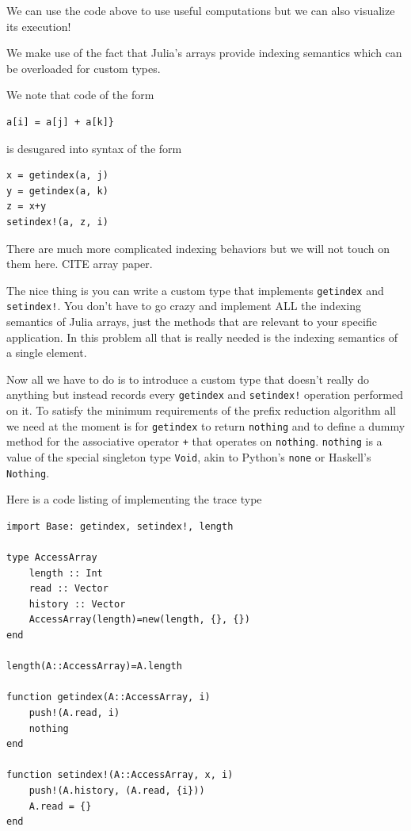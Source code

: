 \documentclass{sig-alternate}
\newcommand{\code}[1]{\texttt{#1}}
\begin{document}
We can use the code above to use useful computations but we can also visualize its execution!

We make use of the fact that Julia's arrays provide indexing semantics which can be overloaded for custom types.

We note that code of the form

\begin{verbatim}
a[i] = a[j] + a[k]}
\end{verbatim}
is desugared into syntax of the form

\begin{verbatim}
x = getindex(a, j)
y = getindex(a, k)
z = x+y
setindex!(a, z, i)
\end{verbatim}

There are much more complicated indexing behaviors but we will not touch on them here. CITE array paper.

The nice thing is you can write a custom type that implements \code{getindex} and \code{setindex!}. You don't have to go crazy and implement ALL the indexing semantics of Julia arrays, just the methods that are relevant to your specific application. In this problem all that is really needed is the indexing semantics of a single element.

Now all we have to do is to introduce a custom type that doesn't really do anything but instead records every \code{getindex} and \code{setindex!} operation performed on it. To satisfy the minimum requirements of the prefix reduction algorithm all we need at the moment is for \code{getindex} to return \code{nothing} and to define a dummy method for the associative operator \code{+} that operates on \code{nothing}. \code{nothing} is a value of the special singleton type \code{Void}, akin to Python's \code{none} or Haskell's \code{Nothing}.

Here is a code listing of implementing the trace type

\begin{verbatim}
import Base: getindex, setindex!, length

type AccessArray
    length :: Int
    read :: Vector
    history :: Vector
    AccessArray(length)=new(length, {}, {})
end

length(A::AccessArray)=A.length

function getindex(A::AccessArray, i)
    push!(A.read, i)
    nothing
end

function setindex!(A::AccessArray, x, i)
    push!(A.history, (A.read, {i}))
    A.read = {}
end
\end{verbatim}
\end{document}
